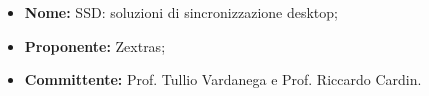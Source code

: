\begin{itemize}
\item {\bf Nome:} 	SSD: soluzioni di sincronizzazione desktop;
\item {\bf Proponente:} Zextras;
\item {\bf Committente:} Prof. Tullio Vardanega e Prof. Riccardo Cardin.
\end{itemize}